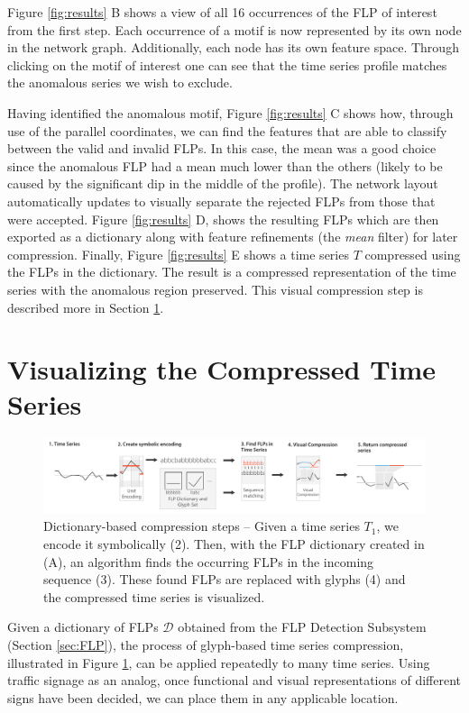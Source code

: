 Figure \ref{fig:results} B shows a view of all 16 occurrences of the FLP of interest from the first step. 
Each occurrence of a motif is now represented by its own node in the network graph. 
Additionally, each node has its own feature space. 
Through clicking on the motif of interest one can see that the time series profile matches the anomalous series we wish to exclude.

Having identified the anomalous motif, Figure \ref{fig:results} C shows how, through use of the parallel coordinates, we can find the features that are able to classify between the valid and invalid FLPs. 
In this case, the mean was a good choice since the anomalous FLP had a mean much lower than the others (likely to be caused by the significant dip in the middle of the profile). 
The network layout automatically updates to visually separate the rejected FLPs from those that were accepted. 
Figure \ref{fig:results} D, shows the resulting FLPs which are then exported as a dictionary along with feature refinements (\eg the \emph{mean} filter) for later compression. 
Finally, Figure \ref{fig:results} E shows a time series $T$ compressed using the FLPs in the dictionary. 
The result is a compressed representation of the time series with the anomalous region preserved. 
This visual compression step is described more in Section \ref{sec:vis_results}.
 
\section{Visualizing the Compressed Time Series}
\label{sec:vis_results}

\begin{figure}[t!]
\centering
\includegraphics[width=\textwidth]{images/timeseries/glyph_creation_workflow}
\caption{Dictionary-based compression steps -- Given a time series $T_1$, we encode it symbolically (2). Then, with the FLP dictionary created in (A), an algorithm finds the occurring FLPs in the incoming sequence (3). These found FLPs are replaced with glyphs (4) and the compressed time series is visualized.}
\label{fig:compression_workflow}
\end{figure}

Given a dictionary of FLPs $\mathcal{D}$ obtained from the FLP Detection Subsystem (Section \ref{sec:FLP}), the process of glyph-based time series compression, illustrated in Figure \ref{fig:compression_workflow}, can be applied repeatedly to many time series.
Using traffic signage as an analog, once functional and visual representations of different signs have been decided, we can place them in any applicable location.

